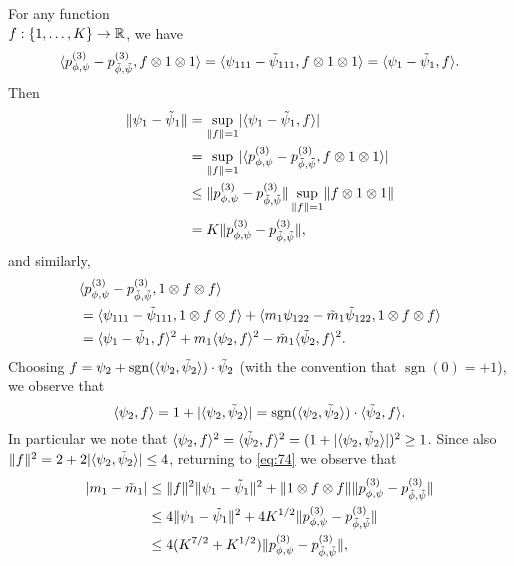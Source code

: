 \documentclass[journal]{IEEEtran}
\newcommand{\sgn}{\mathrm{sgn}}
\newcommand{\1}{\boldsymbol{1}}
\DeclareMathOperator{\sign}{sgn}
\DeclarePairedDelimiter{\Inner}{\langle}{\rangle}
\DeclarePairedDelimiter{\braces}{\{}{\}}
\DeclarePairedDelimiter{\ip}{\langle}{\rangle}
\DeclarePairedDelimiter{\norm}{\lVert}{\rVert}
\DeclarePairedDelimiter{\abs}{\lvert}{\rvert}
\newcommand{\RR}{\mathbb{R}}
\begin{document}
For any function \\ $f:\braces{1,\dots,K}\to \RR$, we have
\begin{equation*}
	\Inner{p_{\phi,\psi}^{(3)} - p_{\tilde{\phi},\tilde{\psi}}^{(3)}, f \otimes 1\otimes 1}%
	= \Inner{\psi_{111} - \tilde{\psi}_{111},f\otimes 1 \otimes 1}
	= \Inner{\psi_1 - \tilde{\psi}_1, f}.
\end{equation*}
Then
\begin{align}
	\norm{\psi_1 - \tilde{\psi}_1}%
	&= \sup_{\norm{f}=1}\abs{\ip{\psi_1 - \tilde{\psi}_1, f}} \nonumber \\%
	&= \sup_{\norm{f}=1}\abs{\ip{p_{\phi,\psi}^{(3)} - p_{\tilde{\phi},\tilde{\psi}}^{(3)}, f \otimes 1\otimes 1}} \nonumber \\
	&\leq \norm{p_{\phi,\psi}^{(3)} - p_{\tilde{\phi},\tilde{\psi}}^{(3)}} \sup_{\norm{f}=1}\norm{f\otimes 1 \otimes 1} \nonumber\\
  	\label{eq:73}
  &= K\norm{p_{\phi,\psi}^{(3)} - p_{\tilde{\phi},\tilde{\psi}}^{(3)}},
\end{align}
and similarly,
\begin{align}
  &\Inner{p_{\phi,\psi}^{(3)} - p_{\tilde{\phi},\tilde{\psi}}^{(3)},1 \otimes f \otimes f}\nonumber\\%
	&= \Inner{\psi_{111} - \tilde{\psi}_{111}, 1 \otimes f \otimes f} + \Inner{m_1\psi_{122} - \tilde{m}_1\tilde{\psi}_{122},1\otimes f \otimes f} \nonumber \\
	\label{eq:74}
	&= \Inner{\psi_1 - \tilde{\psi}_1,f}^2 + m_1 \Inner{\psi_2,f}^2 - \tilde{m}_1\Inner{\tilde{\psi}_2,f}^2.
\end{align}
Choosing
$f = \psi_2 + \sgn(\Inner{\psi_2,\tilde{\psi}_2})\cdot \tilde{\psi}_2$ (with the convention that $\sign(0)=+1$), we observe that
\begin{equation*}
	\Inner{\psi_2,f} = 1 + |\Inner{\psi_2,\tilde{\psi}_2}|%
	= \sgn(\Inner{\psi_2,\tilde{\psi}_2})\cdot \Inner{\tilde{\psi}_2,f}.
\end{equation*}
In particular we note that
$\Inner{\psi_2,f}^2 = \Inner{\tilde{\psi}_2,f}^2 = (1 + |\Inner{\psi_2,\tilde{\psi}_2}|)^2 \geq 1$.
Since also $\norm{f}^2=2+2\abs{\ip{\psi_2,\tilde{\psi}_2}}\leq 4$, returning to \eqref{eq:74} we observe that
\begin{align}
	\abs{m_1 - \tilde{m}_1}%
	&\leq \norm{f}^2\norm{\psi_1-\tilde{\psi}_1}^2 + \norm{1\otimes f\otimes f}\norm{p^{(3)}_{\phi,\psi}-p^{(3)}_{\tilde{\phi},\tilde{\psi}}} \nonumber \\
	&\leq 4\norm{\psi_1-\tilde{\psi}_1}^2+4K^{1/2}\norm{p^{(3)}_{\phi,\psi}-p^{(3)}_{\tilde{\phi},\tilde{\psi}}} \nonumber \\
	\label{eq:76}
	&\leq 4(K^{7/2}+K^{1/2}) \norm{p_{\phi,\psi}^{(3)} - p_{\tilde{\phi},\tilde{\psi}}^{(3)}},
\end{align}
\end{document}

